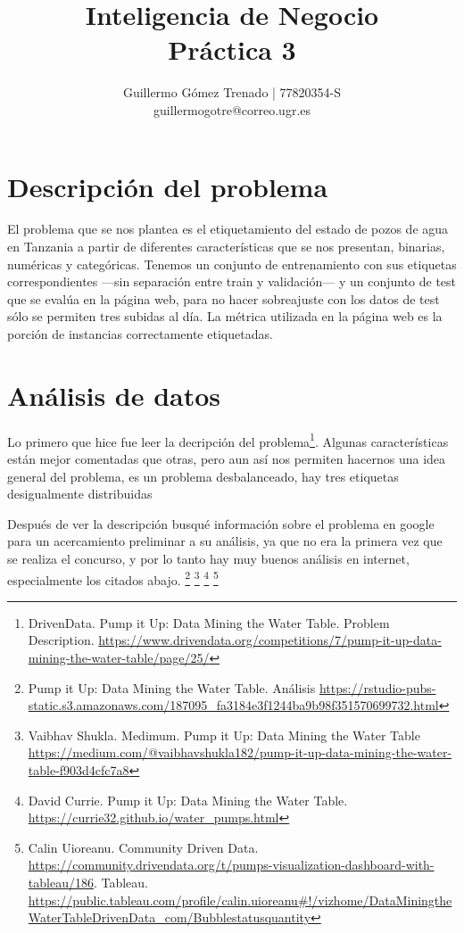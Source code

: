 \documentclass{article}
\title{Inteligencia de Negocio\\
Práctica 3}
\author{Guillermo G\'omez Trenado | 77820354-S \\
guillermogotre@correo.ugr.es}
\newcommand{\img}[2]{
\noindent\makebox[\textwidth][c]{\texttt{[image: imgs/\#1]}}%
}
\begin{document}

\maketitle

\tableofcontents

\newpage

\section{Descripción del problema}

El problema que se nos plantea es el etiquetamiento del estado de pozos de agua en Tanzania a partir de diferentes características que se nos presentan, binarias, numéricas y categóricas. Tenemos un conjunto de entrenamiento con sus etiquetas correspondientes ---sin separación entre train y validación--- y un conjunto de test que se evalúa en la página web, para no hacer sobreajuste con los datos de test sólo se permiten tres subidas al día. La métrica utilizada en la página web es la porción de instancias correctamente etiquetadas.

\section{Análisis de datos}

Lo primero que hice fue leer la decripción del problema\footnote{DrivenData. Pump it Up: Data Mining the Water Table. Problem Description. \url{https://www.drivendata.org/competitions/7/pump-it-up-data-mining-the-water-table/page/25/}}. Algunas características están mejor comentadas que otras, pero aun así nos permiten hacernos una idea general del problema, es un problema desbalanceado, hay tres etiquetas desigualmente distribuidas 

\img{labeldistribution}{0.5}
Después de ver la descripción busqué información sobre el problema en google para un acercamiento preliminar a su análisis, ya que no era la primera vez que se realiza el concurso, y por lo tanto hay muy buenos análisis en internet, especialmente los citados abajo. \footnote{Pump it Up: Data Mining the Water Table. Análisis \url{https://rstudio-pubs-static.s3.amazonaws.com/187095_fa3184e3f1244ba9b98f351570699732.html}} \footnote{Vaibhav Shukla. Medimum. Pump it Up: Data Mining the Water Table \url{https://medium.com/@vaibhavshukla182/pump-it-up-data-mining-the-water-table-f903d4cfc7a8}} \footnote{David Currie. Pump it Up: Data Mining the Water Table. \url{https://currie32.github.io/water_pumps.html}} \footnote{Calin Uioreanu. Community Driven Data. \url{https://community.drivendata.org/t/pumps-visualization-dashboard-with-tableau/186}. Tableau. \url{https://public.tableau.com/profile/calin.uioreanu\#!/vizhome/DataMiningtheWaterTableDrivenData_com/Bubblestatusquantity}}
\end{document}
